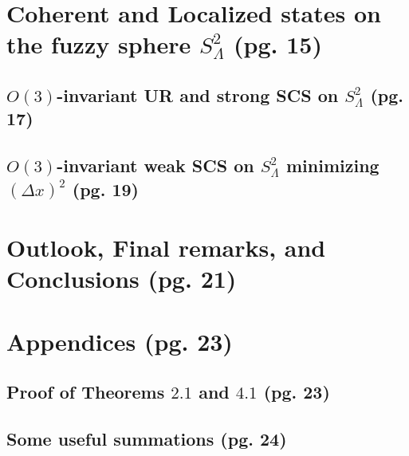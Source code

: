 \documentclass{article}
\begin{document}
\section{Coherent and Localized states on the fuzzy sphere $S^2_\Lambda$ (pg. 15)}

\subsection{$O(3)$-invariant UR and strong SCS on $S^2_\Lambda$ (pg. 17)}

\subsection{$O(3)$-invariant weak SCS on $S^2_\Lambda$ minimizing $(\Delta x)^2$ (pg. 19)}

\section{Outlook, Final remarks, and Conclusions (pg. 21)}

\section{Appendices (pg. 23)}

\subsection{Proof of Theorems $2.1$ and $4.1$ (pg. 23)}

\subsection{Some useful summations (pg. 24)}
\end{document}
